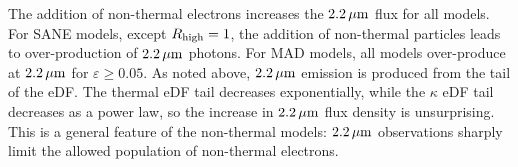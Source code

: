 







The addition of non-thermal electrons increases the $2.2\,\mu\mathrm{m}$ flux for all models. For SANE models, except $R_\mathrm{high}=1$, the addition of non-thermal particles leads to over-production of $2.2\,\mu\mathrm{m}$ photons. For MAD models, all models over-produce at $2.2\,\mu\mathrm{m}$ for $\varepsilon \ge 0.05$. As noted above, $2.2\,\mu\mathrm{m}$ emission is produced from the tail of the eDF.  The thermal eDF tail decreases exponentially, while the $\kappa$ eDF tail decreases as a power law, so the increase in $2.2\,\mu\mathrm{m}$ flux density is unsurprising.  This is a general feature of the non-thermal models: $2.2\,\mu\mathrm{m}$ observations sharply limit the allowed population of non-thermal electrons.


